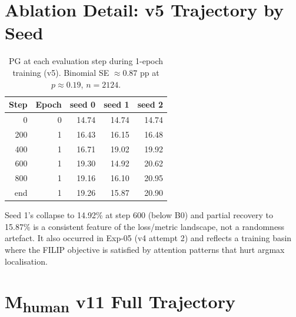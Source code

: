 \documentclass{article}
\begin{document}
\section{Ablation Detail: v5 Trajectory by Seed}
\label{app:v5traj}

\begin{table}[H]
\centering
\caption{PG at each evaluation step during 1-epoch training (v5). Binomial SE
$\approx 0.87$ pp at $p \approx 0.19$, $n=2124$.}
\begin{tabular}{rrrrr}
\toprule
Step & Epoch & seed 0 & seed 1 & seed 2 \\
\midrule
0   & 0 & 14.74 & 14.74 & 14.74 \\
200 & 1 & 16.43 & 16.15 & 16.48 \\
400 & 1 & 16.71 & 19.02 & 19.92 \\
600 & 1 & 19.30 & 14.92 & 20.62 \\
800 & 1 & 19.16 & 16.10 & 20.95 \\
end & 1 & 19.26 & 15.87 & 20.90 \\
\bottomrule
\end{tabular}
\end{table}

Seed 1's collapse to 14.92\% at step 600 (below B0) and partial recovery to
15.87\% is a consistent feature of the loss/metric landscape, not a randomness
artefact. It also occurred in Exp-05 (v4 attempt 2) and reflects a training
basin where the FILIP objective is satisfied by attention patterns that hurt
argmax localisation.

\section{M\textsubscript{human} v11 Full Trajectory}
\label{app:v11traj}
\end{document}
